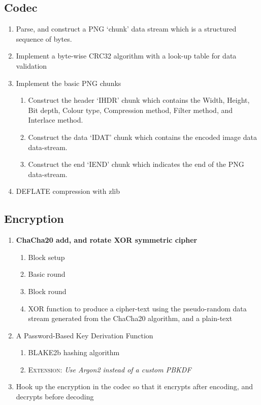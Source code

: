 \documentclass{report}
\begin{document}
\subsection{Codec}
\begin{enumerate}
    \item Parse, and construct a PNG `chunk' data stream which is a structured sequence of bytes. \checkmark
    \item Implement a byte-wise CRC32 algorithm \cite{crc32} with a look-up table for data validation \checkmark
    \item Implement the basic PNG chunks \checkmark
    \begin{enumerate}
        \item Construct the header `IHDR' chunk which contains the Width, Height, Bit depth, Colour type, Compression method, Filter method, and Interlace method. \checkmark
        \item Construct the data `IDAT' chunk which contains the encoded image data data-stream. \checkmark
        \item Construct the end `IEND' chunk which indicates the end of the PNG data-stream. \checkmark
    \end{enumerate}
    \item DEFLATE\cite{deflate} compression with zlib\cite{libzlib} \checkmark
\end{enumerate}

\subsection{Encryption}
\begin{enumerate}
    \item \textbf{ChaCha20 add, and rotate XOR symmetric cipher} \checkmark
    \begin{enumerate}
        \item Block setup \checkmark
        \item Basic round \checkmark
        \item Block round \checkmark
        \item XOR function to produce a cipher-text using the pseudo-random data stream generated from the ChaCha20 algorithm, and a plain-text \checkmark
    \end{enumerate}
    \item A Password-Based Key Derivation Function \checkmark
    \begin{enumerate}        
        \item BLAKE2b hashing algorithm \checkmark
        \item \textsc{Extension:} \textit{Use Argon2 instead of a custom PBKDF}
    \end{enumerate}
    \item Hook up the encryption in the codec so that it encrypts after encoding, and decrypts before decoding \checkmark
\end{enumerate}
\end{document}
